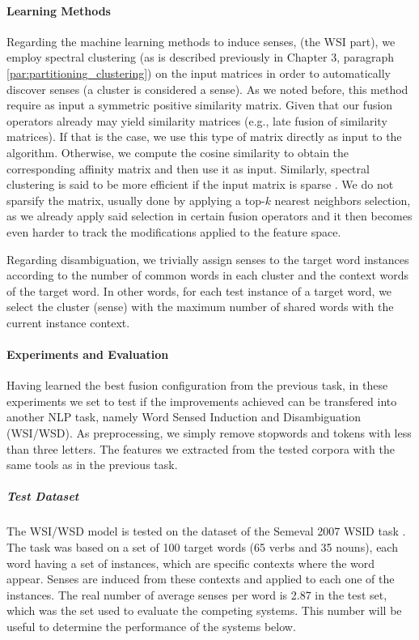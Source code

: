 \paragraph{Learning Methods}
Regarding the machine learning methods to induce senses, (the WSI part), we employ spectral clustering (as is described previously in Chapter 3, paragraph \ref{par:partitioning_clustering}) on the input matrices in order to automatically discover senses (a cluster is considered a sense). As we noted before, this method require as input a symmetric positive similarity matrix. Given that our fusion operators already may yield similarity matrices (e.g., late fusion of similarity matrices). If that is the case, we use this type of matrix directly as input to the algorithm. Otherwise, we compute the cosine similarity to obtain the corresponding affinity matrix and then use it as input. Similarly, spectral clustering is said to be more efficient if the input matrix is sparse \cite{song2008parallel}. We do not sparsify the matrix, usually done by applying a top-$k$ nearest neighbors selection, as we already apply said selection in certain fusion operators and it then becomes even harder to track the modifications applied to the feature space.

 Regarding disambiguation, we trivially assign senses to the target word instances according to the number of common words in each cluster and the context words of the target word. In other words, for each test instance of a target word, we select the cluster (sense) with the maximum number of shared words with the current instance context.

\paragraph{Experiments and Evaluation}
Having learned the best fusion configuration from the previous task, in these experiments we set to test if the improvements achieved can be transfered into another NLP task, namely Word Sensed Induction and Disambiguation (WSI/WSD). As preprocessing, we simply remove stopwords and tokens with less than three letters. The features we extracted from the tested corpora with the same tools as in the previous task.
\subparagraph{Test Dataset}
The WSI/WSD model is tested on the dataset of  the Semeval 2007 WSID task \cite{Agirre2007}. The task was based on a set of 100 target words (65 verbs and 35 nouns), each  word having a set of instances, which are specific contexts where the word appear. Senses are induced from these contexts and applied to each one of the instances. The real number of average senses per word is 2.87 in the test set, which was the set used to evaluate the competing systems. This number will be useful to determine the performance of the systems below.



